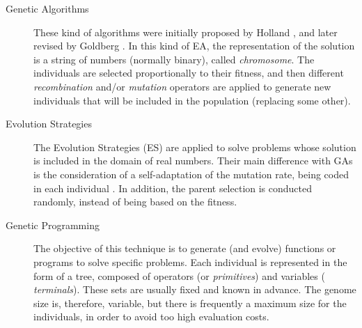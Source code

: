 \documentclass{article}
\begin{document}


\begin{description}
\item [Genetic Algorithms] These kind of algorithms were initially proposed by Holland \cite{holland1975adaptation}, and later revised by Goldberg \cite{goldberg1988genetic}.
In this kind of EA, the representation of the solution is a string of numbers (normally binary), called \textit{chromosome}. The individuals are selected proportionally to their fitness, and then different \textit{recombination} and/or \textit{mutation} operators are applied to generate new individuals that will be included in the population (replacing some other). %

\item[Evolution Strategies] The Evolution Strategies (ES) are applied to solve problems whose solution is included in the domain of real numbers. Their main difference with GAs is the consideration of a self-adaptation of the mutation rate, being coded in each individual \cite{eiben2005shared}. In addition, the parent selection is conducted randomly, instead of being based on the fitness. %



\item[Genetic Programming] The objective of this technique is to
  generate (and evolve) functions or programs to solve specific
  problems. Each individual is represented in the form of a tree,
  composed of operators (or {\em primitives}) and variables ({\em
    terminals}). These sets are usually fixed and known in advance.
  The genome size is, therefore, variable, but there is frequently a maximum size for the individuals, in order to avoid too high evaluation costs. %


\end{description}
\end{document}
